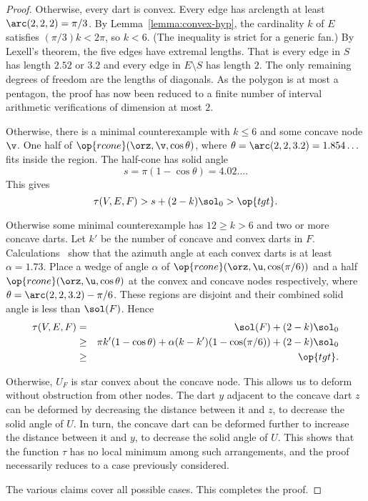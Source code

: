 \begin{proof}
  Otherwise, every dart is convex.
Every edge has
arclength at least $\arc(2,2,2)=\pi/3$.  By
Lemma~\ref{lemma:convex-hyp}, the cardinality $k$ of $E$ satisfies
$(\pi/3)k < 2\pi$, so $k<6$.   (The inequality is strict for a generic fan.)  
By Lexell's theorem, the five edges have extremal lengths.
That is every edge
in $S$ has length $2.52$ or $3.2$ and every edge in $E\setminus S$ has length $2$.
The only remaining degrees of freedom are the lengths of
diagonals.  As the polygon is at most a pentagon, the proof has now
been reduced to a finite number of interval arithmetic verifications
of dimension at most $2$.  

  Otherwise, there is a
minimal counterexample with $k\le 6$ and some concave node $\v$. One
half of $\op{rcone}(\orz,\v,\cos\theta)$, where
$\theta=\arc(2,2,3.2)=1.854\ldots$ fits inside the region.  The
half-cone has solid angle
\begin{displaymath}
s=\pi(1-\cos\theta)=4.02\ldots.
\end{displaymath}
This gives
\begin{displaymath}
\tau(V,E,F) > s + (2-k)\sol_0 > \op{tgt}.
\end{displaymath}
%


  Otherwise some minimal counterexample has
$12\ge k>6$ and two or more concave darts.
Let $k'$ be the number of concave and convex darts in
$F$.
Calculations~\cite[cc:lft]{hales:2009:nonlinear}%
show that the azimuth angle at each convex darts is at least
$\alpha=1.73$.  Place a wedge of angle $\alpha$ of
$\op{rcone}(\orz,\u,\cos(\pi/6))$ and a half
$\op{rcone}(\orz,\u,\cos\theta)$ at the convex and concave nodes
respectively, where $\theta=\arc(2,2,3.2)-\pi/6$.  These regions are
disjoint and their combined solid angle is less than $\sol(F)$.  Hence
\begin{eqnarray*}
\tau(V,E,F)&=&\sol(F)+(2-k)\sol_0 \\
&\ge& \pi k' (1-\cos\theta)
+ \alpha (k-k') (1-\cos(\pi/6)) + (2-k)\sol_0\\
&\ge&\op{tgt}.\\
\end{eqnarray*}


 Otherwise, $U_F$ is star
convex about the concave node.  This allows us to deform without
obstruction from other nodes.  The dart $y$ adjacent to the concave
dart $z$ can be deformed by decreasing the distance between it and
$z$, to decrease the solid angle of $U$.  In turn, the concave dart
can be deformed further to increase the distance between it and $y$,
to decrease the solid angle of $U$.  This shows that the function
$\tau$ has no local minimum among such arrangements, and the proof
necessarily reduces to a case previously considered.  
%
%


The various claims cover all possible cases.  This completes
the proof.
\end{proof}



